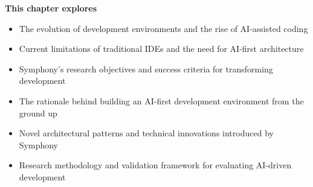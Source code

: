\begin{tcolorbox}[
    enhanced,
    colback=white,
    colframe=brandPrimary!40,
    boxrule=1pt,
    arc=12pt,
    drop shadow={brandPrimary!20},
    left=1.5cm,
    right=1.5cm,
    top=1.2cm,
    bottom=1.2cm,
    before upper={\parindent0pt}
]
\begin{center}
{\Large\textbf{\textcolor{brandPrimary}{This chapter explores}}}
\end{center}

\vspace{0.8cm}

\begin{itemize}[leftmargin=1.2cm, itemsep=0.4cm, label={\textcolor{brandAccent}{$\triangleright$}}]
    \item {\large The evolution of development environments and the rise of AI-assisted coding}
    \item {\large Current limitations of traditional IDEs and the need for AI-first architecture}
    \item {\large Symphony's research objectives and success criteria for transforming development}
    \item {\large The rationale behind building an AI-first development environment from the ground up}
    \item {\large Novel architectural patterns and technical innovations introduced by Symphony}
    \item {\large Research methodology and validation framework for evaluating AI-driven development}
\end{itemize}
\end{tcolorbox}

\clearpage
